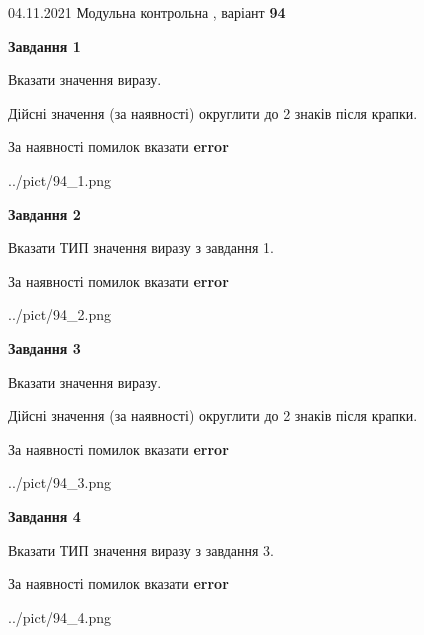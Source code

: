 \documentclass[11pt, ukrainian]{article}
\begin{document}
{04.11.2021 Модульна контрольна , варіант  \No \textbf { 94 }\par}
{
\begin {large}
{\begin {center}\textbf{Завдання 1}\end {center}}\par
Вказати значення виразу. \par
Дійсні значення (за наявності) округлити до 2 знаків після крапки. \par
За наявності помилок вказати \textbf{error}

\begin{center}
	{../pict/94_1.png}
\end{center}
\newpage

{\begin {center}\textbf{Завдання 2}\end {center}}\par
Вказати ТИП значення виразу з завдання 1. \par
За наявності помилок вказати \textbf{error}

\begin{center}
	{../pict/94_2.png}
\end{center}
\newpage

{\begin {center}\textbf{Завдання 3}\end {center}}\par
Вказати значення виразу. \par
Дійсні значення (за наявності) округлити до 2 знаків після крапки. \par
За наявності помилок вказати \textbf{error}

\begin{center}
	{../pict/94_3.png}
\end{center}
\newpage

{\begin {center}\textbf{Завдання 4}\end {center}}\par
Вказати ТИП значення виразу з завдання 3. \par
За наявності помилок вказати \textbf{error}

\begin{center}
	{../pict/94_4.png}
\end{center}
\newpage


\end{large}}
\end{document}
